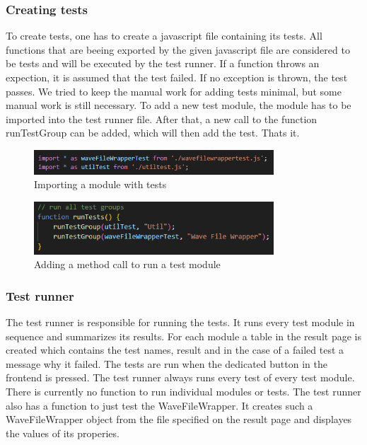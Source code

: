 \subsubsection{Creating tests}
To create tests, one has to create a javascript file containing its tests. All functions that are beeing exported by the given javascript file are considered to be tests and will be executed by the test runner. If a function throws an expection, it is assumed that the test failed. If no exception is thrown, the test passes. 
We tried to keep the manual work for adding tests minimal, but some manual work is still necessary. To add a new test module, the module has to be imported into the test runner file. After that, a new call to the function runTestGroup can be added, which will then add the test. Thats it.

\begin{figure}[H]
    \centering
    \includegraphics[width=0.8\textwidth]{../assets/import_test_module.png}
    \caption{Importing a module with tests}
\end{figure}

\begin{figure}[H]
    \centering
    \includegraphics[width=0.8\textwidth]{../assets/add_call_to_runTestGroup.png}
    \caption{Adding a method call to run a test module}
\end{figure}

\subsubsection{Test runner}
The test runner is responsible for running the tests. It runs every test module in sequence and summarizes its results. For each module a table in the result page is created which contains the test names, result and in the case of a failed test a message why it failed. The tests are run when the dedicated button in the frontend is pressed. The test runner always runs every test of every test module. There is currently no function to run individual modules or tests.
The test runner also has a function to just test the WaveFileWrapper. It creates such a WaveFileWrapper object from the file specified on the result page and displayes the values of its properies.

